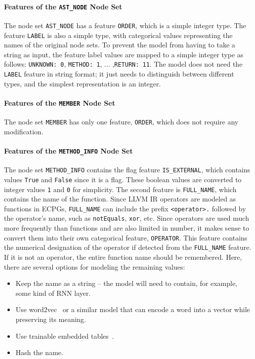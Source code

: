 \paragraph{Features of the \texttt{AST\_NODE} Node Set}
The node set \texttt{AST\_NODE} has a feature \texttt{ORDER}, which is a simple integer type. The feature \texttt{LABEL} is also a simple type, with categorical values representing the names of the original node sets. To prevent the model from having to take a string as input, the feature label values are mapped to a simple integer type as follows: \texttt{UNKNOWN: 0}, \texttt{METHOD: 1}, ... ,\texttt{RETURN: 11}. The model does not need the \texttt{LABEL} feature in string format; it just needs to distinguish between different types, and the simplest representation is an integer.

\paragraph{Features of the \texttt{MEMBER} Node Set}
The node set \texttt{MEMBER} has only one feature, \texttt{ORDER}, which does not require any modification.

\paragraph{Features of the \texttt{METHOD\_INFO} Node Set}
The node set \texttt{METHOD\_INFO} contains the flag feature \texttt{IS\_EXTERNAL}, which contains values \texttt{True} and \texttt{False} since it is a flag. These boolean values are converted to integer values \texttt{1} and \texttt{0} for simplicity. The second feature is \texttt{FULL\_NAME}, which contains the name of the function. Since LLVM IR operators are modeled as functions in ECPGs, \texttt{FULL\_NAME} can include the prefix \texttt{<operator>.} followed by the operator's name, such as \texttt{notEquals}, \texttt{xor}, etc. Since operators are used much more frequently than functions and are also limited in number, it makes sense to convert them into their own categorical feature, \texttt{OPERATOR}. This feature contains the numerical designation of the operator if detected from the \texttt{FULL\_NAME} feature. If it is not an operator, the entire function name should be remembered. Here, there are several options for modeling the remaining values:
\begin{itemize}
    \item Keep the name as a string -- the model will need to contain, for example, some kind of RNN layer.
    \item Use word2vec~\cite{mikolov2013efficient} or a similar model that can encode a word into a vector while preserving its meaning.
    \item Use trainable embedded tables~\cite{tfgnn-gnn-modeling}.
    \item Hash the name.
\end{itemize}

